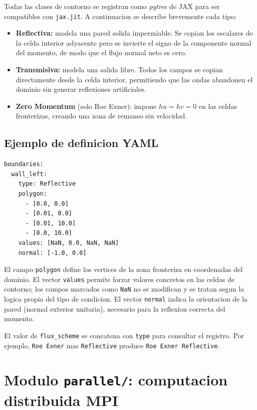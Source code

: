 \documentclass[11pt,a4paper]{article}
\newcommand{\code}[1]{\texttt{#1}}
\begin{document}
Todas las clases de contorno se registran como \emph{pytree} de JAX para ser compatibles con
\code{jax.jit}. A continuacion se describe brevemente cada tipo:

\begin{itemize}[leftmargin=1.6em]
  \item \textbf{Reflectiva:} modela una pared solida impermiable. Se copian los escalares de la
  celda interior adyacente pero se invierte el signo de la componente normal del momento, de modo
  que el flujo normal neto es cero.
  \item \textbf{Transmisiva:} modela una salida libre. Todos los campos se copian directamente
  desde la celda interior, permitiendo que las ondas abandonen el dominio sin generar reflexiones
  artificiales.
  \item \textbf{Zero Momentum} (solo Roe Exner): impone $hu = hv = 0$ en las celdas fronterizas,
  creando una zona de remanso sin velocidad.
\end{itemize}

\subsection{Ejemplo de definicion YAML}

\begin{Verbatim}[fontsize=\small]
boundaries:
  wall_left:
    type: Reflective
    polygon:
      - [0.0, 0.0]
      - [0.01, 0.0]
      - [0.01, 10.0]
      - [0.0, 10.0]
    values: [NaN, 0.0, NaN, NaN]
    normal: [-1.0, 0.0]
\end{Verbatim}

El campo \code{polygon} define los vertices de la zona fronteriza en coordenadas del dominio.
El vector \code{values} permite forzar valores concretos en las celdas de contorno; los campos
marcados como \code{NaN} no se modifican y se tratan segun la logica propia del tipo de condicion.
El vector \code{normal} indica la orientacion de la pared (normal exterior unitaria), necesario
para la reflexion correcta del momento.

El valor de \code{flux\_scheme} se concatena con \code{type} para consultar el registro. Por ejemplo,
\code{Roe Exner} mas \code{Reflective} produce \code{Roe Exner Reflective}.

\section{Modulo \code{parallel/}: computacion distribuida MPI}
\end{document}
